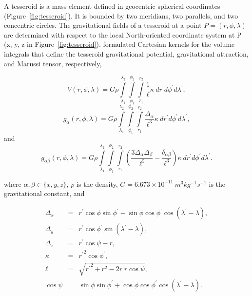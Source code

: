 \documentclass[paper,twocolumn]{geophysics}
\begin{document}
A tesseroid is a mass element defined in geocentric spherical
coordinates
(Figure~\ref{fig:tesseroid}).
It is bounded by two meridians, two parallels, and two concentric circles.
The gravitational fields of a tesseroid at a point $P = (r,\phi,\lambda)$
are determined with respect to the local North-oriented coordinate system at
P (x, y, z in Figure~\ref{fig:tesseroid}).
\citet{Grombein2013} formulated Cartesian kernels for the volume integrals
that define the tesseroid gravitational potential, gravitational attraction,
and Marussi tensor, respectively,

\begin{equation}
    V(r,\phi,\lambda) = G \rho
        \int\limits_{\lambda_1}^{\lambda_2}
        \int\limits_{\phi_1}^{\phi_2}
        \int\limits_{r_1}^{r_2}
        \frac{1}{\ell}
        \kappa\  dr^\prime d\phi^\prime d\lambda^\prime,
    \label{eq:tesspot}
\end{equation}
\begin{equation}
    g_{\alpha}(r,\phi,\lambda) = G \rho
        \int\limits_{\lambda_1}^{\lambda_2}
        \int\limits_{\phi_1}^{\phi_2}
        \int\limits_{r_1}^{r_2}
        \frac{\Delta_\alpha}{\ell^3}
        \kappa\ dr^\prime d\phi^\prime d\lambda^\prime,
    \label{eq:tessgrav}
\end{equation}
\noindent
and
\begin{equation}
    g_{\alpha\beta}(r,\phi,\lambda) = G \rho
        \int\limits_{\lambda_1}^{\lambda_2}
        \int\limits_{\phi_1}^{\phi_2}
        \int\limits_{r_1}^{r_2}
        \left(
            \frac{3\Delta_{\alpha} \Delta_{\beta}}{\ell^5} -
            \frac{\delta_{\alpha\beta}}{\ell^3}
        \right)
        \kappa\ dr^\prime d\phi^\prime d\lambda^\prime.
    \label{eq:tesstensor}
\end{equation}

\noindent
where $\alpha, \beta \in \{x, y, z\}$,
$\rho$ is the density,
$G = 6.673\times10^{-11}\ m^3kg^{-1}s^{-1}$ is the gravitational constant,
and

\begin{eqnarray}
    \Delta_x &=& r^\prime\cos\phi\sin\phi^\prime - \sin\phi\cos\phi^\prime
                 \cos(\lambda^\prime - \lambda), \\
    \Delta_y &=& r^\prime \cos \phi^\prime \sin(\lambda^\prime - \lambda), \\
    \Delta_z &=& r^\prime \cos \psi - r,\\
    \kappa &=& {r^\prime}^2 \cos \phi^\prime, \\
    \ell &=& \sqrt{{r^\prime}^2 + r^2 - 2 r^\prime r \cos \psi}, \\
    \cos\psi &=& \sin\phi\sin\phi^\prime + \cos\phi\cos\phi^\prime
                 \cos(\lambda^\prime - \lambda).
\end{eqnarray}
\end{document}

